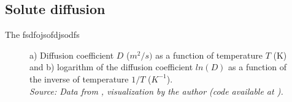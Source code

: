 \subsection{Solute diffusion}

The fsdfojsofdjsodfs

\begin{figure}[h]
 \centering
 \captionsetup{justification=centering}
 \caption{a) Diffusion coefficient $D$ ($m^2/s)$ as a function of temperature $T$ (K) and b) logarithm of the diffusion coefficient $ln(D)$ as a function of the inverse of temperature $1/T$ ($K^{-1}$). \\
 \textit{Source: Data from \citep{kakusan}, visualization by the author (code available at \citep{mygit}).}}
 \label{fig:diffusion}
\end{figure}







